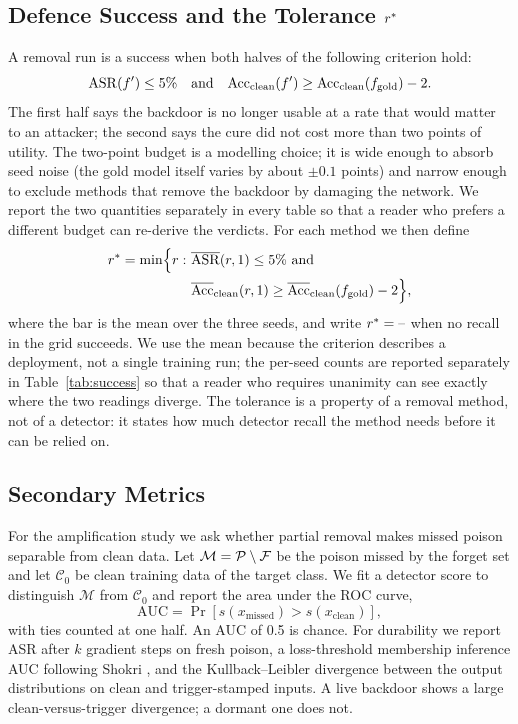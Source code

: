 \subsection{Defence Success and the Tolerance $r^{\ast}$}
A removal run is a success when both halves of the following criterion hold:
\begin{equation}
\mathrm{ASR}(f')\leq 5\%\quad\text{and}\quad
\mathrm{Acc}_{\mathrm{clean}}(f')\geq
\mathrm{Acc}_{\mathrm{clean}}(f_{\mathrm{gold}})-2.
\label{eq:success}
\end{equation}
The first half says the backdoor is no longer usable at a rate that would matter
to an attacker; the second says the cure did not cost more than two points of
utility. The two-point budget is a modelling choice; it is wide enough to absorb
seed noise (the gold model itself varies by about $\pm0.1$ points) and narrow
enough to exclude methods that remove the backdoor by damaging the network. We
report the two quantities separately in every table so that a reader who prefers
a different budget can re-derive the verdicts. For each method we then define
\begin{equation}
\begin{aligned}
r^{\ast}=\min\Bigl\{r:\ &\overline{\mathrm{ASR}}(r,1)\leq 5\%\ \text{and}\\
&\overline{\mathrm{Acc}}_{\mathrm{clean}}(r,1)\geq
\overline{\mathrm{Acc}}_{\mathrm{clean}}(f_{\mathrm{gold}})-2\Bigr\},
\end{aligned}
\label{eq:rstar}
\end{equation}
where the bar is the mean over the three seeds, and write $r^{\ast}=\text{--}$ when
no recall in the grid succeeds. We use the mean because the criterion describes a
deployment, not a single training run; the per-seed counts are reported
separately in Table~\ref{tab:success} so that a reader who requires unanimity can
see exactly where the two readings diverge. The tolerance is a property of a
removal method, not of a detector: it states how much detector recall the method
needs before it can be relied on.

\subsection{Secondary Metrics}
For the amplification study we ask whether partial removal makes missed poison
separable from clean data. Let $\mathcal{M}=\mathcal{P}\setminus\mathcal{F}$ be the
poison missed by the forget set and let $\mathcal{C}_0$ be clean
training data of the target class. We fit a detector score to distinguish
$\mathcal{M}$ from $\mathcal{C}_0$ and report the area under the ROC curve,
\begin{equation}
\mathrm{AUC}=\Pr\!\left[s(x_{\mathrm{missed}})>s(x_{\mathrm{clean}})\right],
\label{eq:auc}
\end{equation}
with ties counted at one half. An AUC of 0.5 is chance. For durability we report
ASR after $k$ gradient steps on fresh poison, a loss-threshold membership
inference AUC following Shokri \etal{} \cite{mia}, and the Kullback--Leibler
divergence between the output distributions on clean and trigger-stamped inputs.
A live backdoor shows a large clean-versus-trigger divergence; a dormant one does
not.

